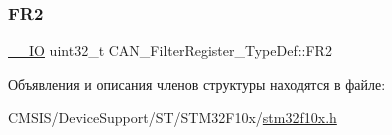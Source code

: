 \mbox{\label{struct_c_a_n___filter_register___type_def_a77959e28a302b05829f6a1463be7f800}} 
\subsubsection{\texorpdfstring{FR2}{FR2}}
{\footnotesize\ttfamily \mbox{\hyperlink{group___c_m_s_i_s___c_m3__core__definitions_gaec43007d9998a0a0e01faede4133d6be}{\+\_\+\+\_\+\+IO}} uint32\+\_\+t C\+A\+N\+\_\+\+Filter\+Register\+\_\+\+Type\+Def\+::\+F\+R2}



Объявления и описания членов структуры находятся в файле\+:\begin{DoxyCompactItemize}
\item 
C\+M\+S\+I\+S/\+Device\+Support/\+S\+T/\+S\+T\+M32\+F10x/\mbox{\hyperlink{stm32f10x_8h}{stm32f10x.\+h}}\end{DoxyCompactItemize}
